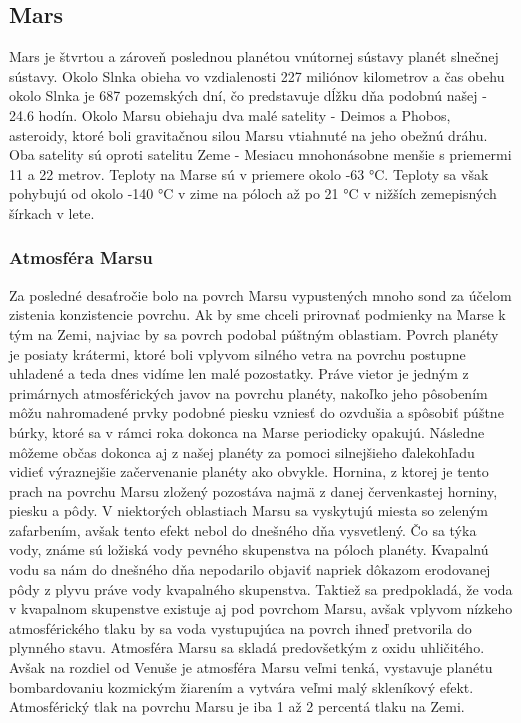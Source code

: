 \subsection{Mars}
Mars je štvrtou a zároveň poslednou planétou vnútornej sústavy planét slnečnej sústavy. Okolo Slnka obieha vo vzdialenosti 227 miliónov kilometrov a čas obehu okolo Slnka je 687 pozemských dní, čo predstavuje dĺžku dňa podobnú našej - 24.6 hodín. Okolo Marsu obiehaju dva malé satelity - Deimos a Phobos, asteroidy, ktoré boli gravitačnou silou Marsu vtiahnuté na jeho obežnú dráhu. Oba satelity sú oproti satelitu Zeme - Mesiacu mnohonásobne menšie s priemermi 11 a 22 metrov. \cite{} Teploty na Marse sú v priemere okolo -63 °C. Teploty sa však pohybujú od okolo -140 °C v zime na póloch až po 21 °C v nižších zemepisných šírkach v lete.

\subsubsection{Atmosféra Marsu}
\label{atmosferaMarsu}
Za posledné desaťročie bolo na povrch Marsu vypustených mnoho sond za účelom zistenia konzistencie povrchu. Ak by sme chceli prirovnať podmienky na Marse k tým na Zemi, najviac by sa povrch podobal púštným oblastiam. Povrch planéty je posiaty krátermi, ktoré boli vplyvom silného vetra na povrchu postupne uhladené a teda dnes vidíme len malé pozostatky. Práve vietor je jedným z primárnych atmosférických javov na povrchu planéty, nakoľko jeho pôsobením môžu nahromadené prvky podobné piesku vzniesť do ozvdušia a spôsobiť púštne búrky, ktoré sa v rámci roka dokonca na Marse periodicky opakujú. Následne môžeme občas dokonca aj z našej planéty za pomoci silnejšieho ďalekohľadu vidieť výraznejšie začervenanie planéty ako obvykle. Hornina, z ktorej je tento prach na povrchu Marsu zložený pozostáva najmä z danej červenkastej horniny, piesku a pôdy. V niektorých oblastiach Marsu sa vyskytujú miesta so zeleným zafarbením, avšak tento efekt nebol do dnešného dňa vysvetlený. Čo sa týka vody, známe sú ložiská vody pevného skupenstva na póloch planéty. Kvapalnú vodu sa nám do dnešného dňa nepodarilo objaviť napriek dôkazom erodovanej pôdy z plyvu práve vody kvapalného skupenstva. Taktiež sa predpokladá, že voda v kvapalnom skupenstve existuje aj pod povrchom Marsu, avšak vplyvom nízkeho atmosférického tlaku by sa voda vystupujúca na povrch ihneď pretvorila do plynného stavu. 
Atmosféra Marsu sa skladá predovšetkým z oxidu uhličitého. Avšak na rozdiel od Venuše je atmosféra Marsu veľmi tenká, vystavuje planétu bombardovaniu kozmickým žiarením a vytvára veľmi malý skleníkový efekt. Atmosférický tlak na povrchu Marsu je iba 1 až 2 percentá tlaku na Zemi. 
